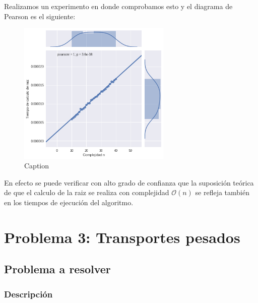 \documentclass[a4paper]{report}
\begin{document}
Realizamos un experimento en donde comprobamos esto y el diagrama de Pearson es el siguiente:

\begin{figure}[h!]
    \centering
    \includegraphics[width=0.65\textwidth]{pearsonCalculoRaiz.png}
    \caption{Caption}
    \label{fig:pearsonraiz}
\end{figure}

En efecto se puede verificar con alto grado de confianza que la suposición teórica de que el calculo de la raiz se realiza con complejidad $\mathcal{O}(n)$ se refleja también en los tiempos de ejecución del algoritmo.

\chapter{Problema 3: Transportes pesados}

\section{Problema a resolver}

\subsection{Descripción}
\end{document}
